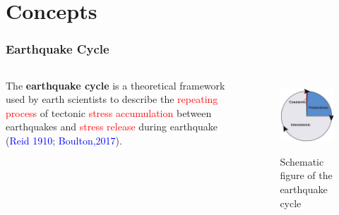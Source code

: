 ﻿\documentclass{beamer}
\begin{document}
\section{Concepts}
\begin{frame}
\frametitle{Earthquake Cycle}

\begin{columns}[c] %

The \textbf{earthquake cycle} is a theoretical framework used by earth scientists to describe the \textcolor{red}{repeating process} of tectonic \textcolor{red}{stress accumulation} between earthquakes and \textcolor{red}{stress release} during earthquake (\textcolor{blue}{Reid 1910; Boulton,2017}).

\begin{figure}
  \centering
  \includegraphics[scale=0.45]{./pic/earthquake_cycle.jpg}\\
  \caption{Schematic figure of the earthquake cycle}\label{fig_okada}
\end{figure}

\end{columns}

\end{frame}
\end{document}
